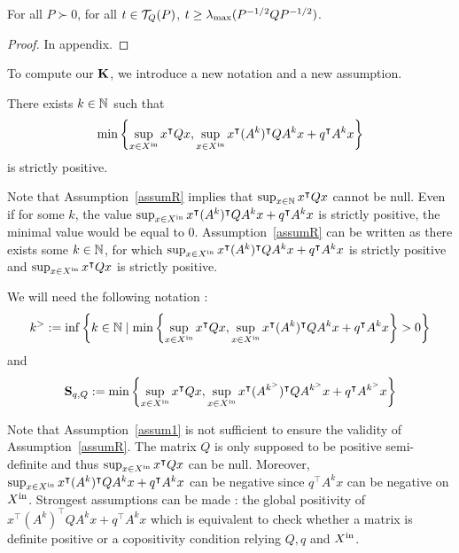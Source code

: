 \documentclass[10pt]{llncs}
\begin{document}
\begin{prop}
\label{propcont}
For all $P\succ 0$, for all $t\in\mathcal{T}_{Q}(P)$, $t\geq \lambda_{\operatorname{max}}(P^{-1/2} Q P^{-1/2})$.
\end{prop}
\begin{proof}
In appendix.
\end{proof}
%
To compute our $\mathbf{K}$, we introduce a new notation and a new assumption. 
 \begin{assumption}
\label{assumR}
There exists $k\in\mathbb{N}$ such that\[\min\left\{\sup_{x\in X^\mathrm{in}} x^\intercal Q x , \sup_{x\in X^\mathrm{in}} x^\intercal (A^k)^\intercal Q A^k x+q^\intercal A^k x\right\}\] is strictly positive.
\end{assumption}

Note that Assumption~\ref{assumR} implies that $\sup_{x\in\mathbb{N}} x^\intercal Q x$ cannot be null. Even if for some $k$, the value
$\sup_{x\in X^\mathrm{in}} x^\intercal (A^k)^\intercal Q A^k x+q^\intercal A^k x$ is strictly positive, the minimal value would be equal to 0. 
Assumption~\ref{assumR} can be written as there exists  some $k\in\mathbb{N}$, for which $\sup_{x\in X^\mathrm{in}} x^\intercal (A^k)^\intercal Q A^k x+q^\intercal A^k x$ is strictly positive and $\sup_{x\in X^\mathrm{in}} x^\intercal Q x$ is strictly positive.
 
We will need the following notation :
\[
k^{>}:=\inf\left\{k\in\mathbb{N}\mid \min\left\{\sup_{x\in X^\mathrm{in}} x^\intercal Q x , \sup_{x\in X^\mathrm{in}} x^\intercal (A^k)^\intercal Q A^k x+q^\intercal A^k x\right\}>0\right\}
\]
and
\[
\mathbf{S}_{q,Q}:= \min\left\{\sup_{x\in X^\mathrm{in}} x^\intercal Q x , \sup_{x\in X^\mathrm{in}} x^\intercal (A^{k^{>}})^\intercal Q A^{k^{>}} x+q^\intercal A^{k^{>}}x\right\}
\]

Note that Assumption~\ref{assum1} is not sufficient to ensure the validity of Assumption~\ref{assumR}. The matrix $Q$ is only supposed to be positive semi-definite and thus $\sup_{x\in X^\mathrm{in}} x^\intercal Q x$ can be null. Moreover, $\sup_{x\in X^\mathrm{in}} x^\intercal (A^k)^\intercal Q A^k x+q^\intercal A^k x$ can be negative since $q^\intercal A^k x$ can be negative on $X^\mathrm{in}$. Strongest assumptions can be made : the global positivity of $x^\intercal (A^k)^\intercal  Q A^k x+q^\intercal A^k x$ which is equivalent to check whether a matrix is definite positive or a copositivity condition relying $Q,q$ and $X^\mathrm{in}$. 
\end{document}
